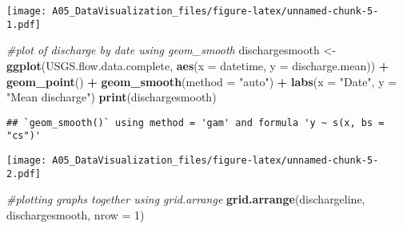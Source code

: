\documentclass[]{article}
\newenvironment{Shaded}{\begin{snugshade}}{\end{snugshade}}
\newcommand{\KeywordTok}[1]{\textcolor[rgb]{0.13,0.29,0.53}{\textbf{#1}}}
\newcommand{\DataTypeTok}[1]{\textcolor[rgb]{0.13,0.29,0.53}{#1}}
\newcommand{\DecValTok}[1]{\textcolor[rgb]{0.00,0.00,0.81}{#1}}
\newcommand{\StringTok}[1]{\textcolor[rgb]{0.31,0.60,0.02}{#1}}
\newcommand{\CommentTok}[1]{\textcolor[rgb]{0.56,0.35,0.01}{\textit{#1}}}
\newcommand{\OperatorTok}[1]{\textcolor[rgb]{0.81,0.36,0.00}{\textbf{#1}}}
\newcommand{\NormalTok}[1]{#1}
\begin{document}
\begin{Shaded}
\end{Shaded}

\texttt{[image: A05\_DataVisualization\_files/figure-latex/unnamed-chunk-5-1.pdf]}

\begin{Shaded}
\begin{Highlighting}[]
\CommentTok{#plot of discharge by date using geom_smooth}
\NormalTok{dischargesmooth <-}\StringTok{ }\KeywordTok{ggplot}\NormalTok{(USGS.flow.data.complete, }\KeywordTok{aes}\NormalTok{(}\DataTypeTok{x =}\NormalTok{ datetime, }\DataTypeTok{y =}\NormalTok{ discharge.mean)) }\OperatorTok{+}
\StringTok{  }\KeywordTok{geom_point}\NormalTok{() }\OperatorTok{+}
\StringTok{  }\KeywordTok{geom_smooth}\NormalTok{(}\DataTypeTok{method =} \StringTok{"auto"}\NormalTok{) }\OperatorTok{+}
\StringTok{  }\KeywordTok{labs}\NormalTok{(}\DataTypeTok{x =} \StringTok{"Date"}\NormalTok{, }\DataTypeTok{y =} \StringTok{"Mean discharge"}\NormalTok{)}
\KeywordTok{print}\NormalTok{(dischargesmooth)}
\end{Highlighting}
\end{Shaded}

\begin{verbatim}
## `geom_smooth()` using method = 'gam' and formula 'y ~ s(x, bs = "cs")'
\end{verbatim}

\texttt{[image: A05\_DataVisualization\_files/figure-latex/unnamed-chunk-5-2.pdf]}

\begin{Shaded}
\begin{Highlighting}[]
\CommentTok{#plotting graphs together using grid.arrange}
\KeywordTok{grid.arrange}\NormalTok{(dischargeline, dischargesmooth, }\DataTypeTok{nrow =} \DecValTok{1}\NormalTok{)}
\end{Highlighting}
\end{Shaded}
\end{document}
